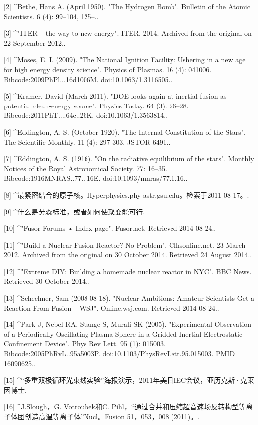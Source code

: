 [2]
^Bethe, Hans A. (April 1950). "The Hydrogen Bomb". Bulletin of the Atomic Scientists. 6 (4): 99–104, 125–..

[3]
^"ITER – the way to new energy". ITER. 2014. Archived from the original on 22 September 2012..

[4]
^Moses, E. I. (2009). "The National Ignition Facility: Ushering in a new age for high energy density science". Physics of Plasmas. 16 (4): 041006. Bibcode:2009PhPl...16d1006M. doi:10.1063/1.3116505..

[5]
^Kramer, David (March 2011). "DOE looks again at inertial fusion as potential clean-energy source". Physics Today. 64 (3): 26–28. Bibcode:2011PhT....64c..26K. doi:10.1063/1.3563814..

[6]
^Eddington, A. S. (October 1920). "The Internal Constitution of the Stars". The Scientific Monthly. 11 (4): 297-303. JSTOR 6491..

[7]
^Eddington, A. S. (1916). "On the radiative equilibrium of the stars". Monthly Notices of the Royal Astronomical Society. 77: 16–35. Bibcode:1916MNRAS..77...16E. doi:10.1093/mnras/77.1.16..

[8]
^最紧密结合的原子核。Hyperphysics.phy-astr.gsu.edu。检索于2011-08-17。.

[9]
^什么是劳森标准，或者如何使聚变能可行.

[10]
^"Fusor Forums • Index page". Fusor.net. Retrieved 2014-08-24..

[11]
^"Build a Nuclear Fusion Reactor? No Problem". Clhsonline.net. 23 March 2012. Archived from the original on 30 October 2014. Retrieved 24 August 2014..

[12]
^"Extreme DIY: Building a homemade nuclear reactor in NYC". BBC News. Retrieved 30 October 2014..

[13]
^Schechner, Sam (2008-08-18). "Nuclear Ambitions: Amateur Scientists Get a Reaction From Fusion – WSJ". Online.wsj.com. Retrieved 2014-08-24..

[14]
^Park J, Nebel RA, Stange S, Murali SK (2005). "Experimental Observation of a Periodically Oscillating Plasma Sphere in a Gridded Inertial Electrostatic Confinement Device". Phys Rev Lett. 95 (1): 015003. Bibcode:2005PhRvL..95a5003P. doi:10.1103/PhysRevLett.95.015003. PMID 16090625..

[15]
^“多重双极循环光束线实验”海报演示，2011年美日IEC会议，亚历克斯·克莱因博士.

[16]
^J.Slough，G. Votroubek和C. Pihl，“通过合并和压缩超音速场反转构型等离子体团创造高温等离子体”Nucl。Fusion 51，053，008 (2011)。.

